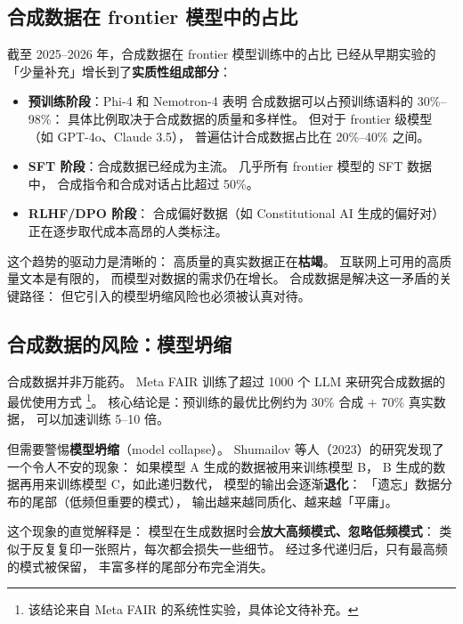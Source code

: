\subsection{合成数据在 frontier 模型中的占比}

截至 2025--2026 年，合成数据在 frontier 模型训练中的占比
已经从早期实验的「少量补充」增长到了\textbf{实质性组成部分}：

\begin{itemize}[noitemsep]
  \item \textbf{预训练阶段}：Phi-4 和 Nemotron-4 表明
        合成数据可以占预训练语料的 30\%--98\%：
        具体比例取决于合成数据的质量和多样性。
        但对于 frontier 级模型（如 GPT-4o、Claude 3.5），
        普遍估计合成数据占比在 20\%--40\% 之间。
  \item \textbf{SFT 阶段}：合成数据已经成为主流。
        几乎所有 frontier 模型的 SFT 数据中，
        合成指令和合成对话占比超过 50\%。
  \item \textbf{RLHF/DPO 阶段}：
        合成偏好数据（如 Constitutional AI 生成的偏好对）
        正在逐步取代成本高昂的人类标注。
\end{itemize}

这个趋势的驱动力是清晰的：
高质量的真实数据正在\textbf{枯竭}。
互联网上可用的高质量文本是有限的，
而模型对数据的需求仍在增长。
合成数据是解决这一矛盾的关键路径：
但它引入的模型坍缩风险也必须被认真对待。

\subsection{合成数据的风险：模型坍缩}

合成数据并非万能药。
Meta FAIR 训练了超过 1000 个 LLM
来研究合成数据的最优使用方式%
\footnote{该结论来自 Meta FAIR 的系统性实验，具体论文待补充。}。
核心结论是：预训练的最优比例约为 30\% 合成 + 70\% 真实数据，
可以加速训练 5--10 倍。

但需要警惕\textbf{模型坍缩}（model collapse）。
Shumailov 等人（2023）的研究发现了一个令人不安的现象：
如果模型 A 生成的数据被用来训练模型 B，
B 生成的数据再用来训练模型 C，如此递归数代，
模型的输出会逐渐\textbf{退化}：
「遗忘」数据分布的尾部（低频但重要的模式），
输出越来越同质化、越来越「平庸」。

这个现象的直觉解释是：
模型在生成数据时会\textbf{放大高频模式、忽略低频模式}：
类似于反复复印一张照片，每次都会损失一些细节。
经过多代递归后，只有最高频的模式被保留，
丰富多样的尾部分布完全消失。


